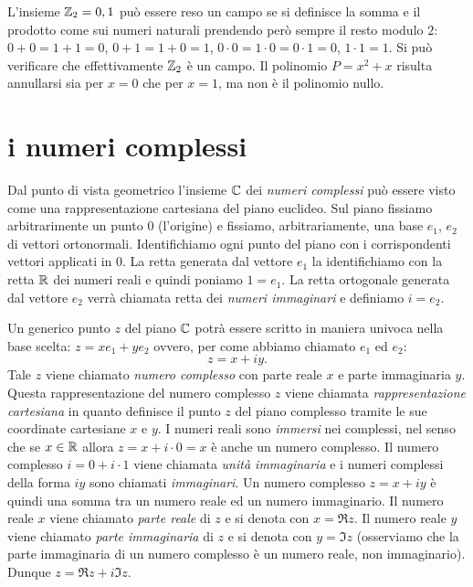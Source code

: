 \begin{example}
L'insieme ${\mathbb Z}_2={0,1}$ può essere reso un campo 
se si definisce la somma e il prodotto come sui 
numeri naturali prendendo però sempre il resto 
modulo $2$: $0+0=1+1=0$, $0+1=1+0=1$, $0\cdot 0
=1\cdot 0 = 0\cdot 1 = 0$, $1\cdot 1=1$.
Si può verificare che effettivamente ${\mathbb Z}_2$ 
è un campo.
Il polinomio $P = x^2+x$ risulta annullarsi sia 
per $x=0$ che per $x=1$, ma non è il polinomio nullo.
\end{example}

\section{i numeri complessi}
%
%
%
\label{sec:complessi}

Dal punto di vista geometrico l'insieme $\CC$ dei \emph{numeri complessi}%
%
\index{$\CC$}
può essere visto come una rappresentazione cartesiana 
del piano euclideo.
Sul piano fissiamo arbitrarimente un punto $0$ (l'origine) 
e fissiamo, arbitrariamente, una base $e_1$, $e_2$ di vettori ortonormali.
Identifichiamo ogni punto del piano con i corrispondenti vettori
applicati in $0$. La retta generata dal vettore $e_1$ la identifichiamo
con la retta ${\mathbb R}$ dei numeri reali e quindi poniamo $1=e_1$.
La retta ortogonale generata dal vettore $e_2$ verrà chiamata
retta dei \emph{numeri immaginari} e definiamo $i=e_2$.

Un generico punto $z$ del piano $\CC$ potrà essere scritto in
maniera univoca nella base scelta: $z = x e_1 + y e_2$ ovvero,
per come abbiamo chiamato $e_1$ ed $e_2$:
\[
z = x + i y.
\]
Tale $z$ viene chiamato
\emph{numero complesso} con parte reale $x$ e parte immaginaria $y$.
Questa rappresentazione del numero complesso $z$ viene
chiamata \emph{rappresentazione cartesiana}%
%
 in quanto definisce
il punto $z$ del piano complesso tramite le sue coordinate cartesiane
$x$ e $y$.
I numeri reali sono \emph{immersi} nei complessi, nel senso che se
$x\in {\mathbb R}$ allora $z= x + i\cdot 0 = x$ è anche un numero complesso.
Il numero complesso $i = 0 + i\cdot 1$ viene chiamata \emph{unità immaginaria}%
%
e i numeri complessi della forma $iy$ sono chiamati \emph{immaginari}.
Un numero
complesso $z = x+iy$ è quindi una somma tra un numero reale ed un numero
immaginario. Il numero reale $x$ viene chiamato \emph{parte reale}
di $z$ e
si denota con $x=\Re z$.
%
Il numero reale $y$ viene chiamato
\emph{parte immaginaria}
di $z$ e si denota con $y=\Im z$
%
(osserviamo che la parte immaginaria di un numero complesso è un numero
reale, non immaginario). Dunque $z= \Re z + i \Im z$.

